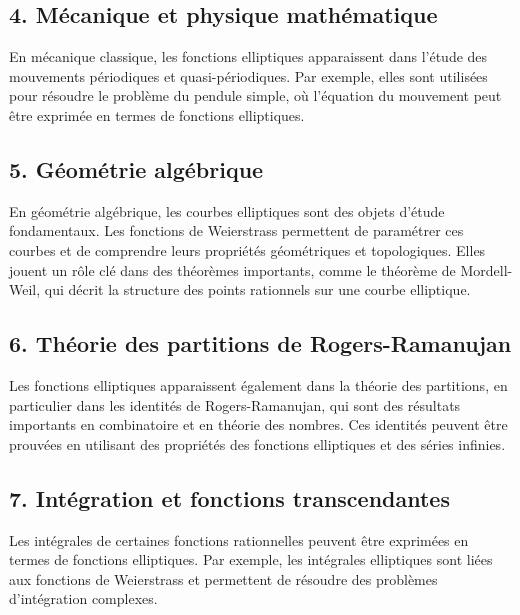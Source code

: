 \documentclass[12pt]{article}
\begin{document}
                        \subsection*{4. Mécanique et physique mathématique}

                        En mécanique classique, les fonctions elliptiques apparaissent dans l'étude des mouvements périodiques et quasi-périodiques. Par exemple, elles sont utilisées pour résoudre le problème du pendule simple, où l'équation du mouvement peut être exprimée en termes de fonctions elliptiques.

                        \subsection*{5. Géométrie algébrique}

                        En géométrie algébrique, les courbes elliptiques sont des objets d'étude fondamentaux. Les fonctions de Weierstrass permettent de paramétrer ces courbes et de comprendre leurs propriétés géométriques et topologiques. Elles jouent un rôle clé dans des théorèmes importants, comme le théorème de Mordell-Weil, qui décrit la structure des points rationnels sur une courbe elliptique.

                        \subsection*{6. Théorie des partitions de Rogers-Ramanujan}

                        Les fonctions elliptiques apparaissent également dans la théorie des partitions, en particulier dans les identités de Rogers-Ramanujan, qui sont des résultats importants en combinatoire et en théorie des nombres. Ces identités peuvent être prouvées en utilisant des propriétés des fonctions elliptiques et des séries infinies.

                        \subsection*{7. Intégration et fonctions transcendantes}

                        Les intégrales de certaines fonctions rationnelles peuvent être exprimées en termes de fonctions elliptiques. Par exemple, les intégrales elliptiques sont liées aux fonctions de Weierstrass et permettent de résoudre des problèmes d'intégration complexes.
\end{document}
